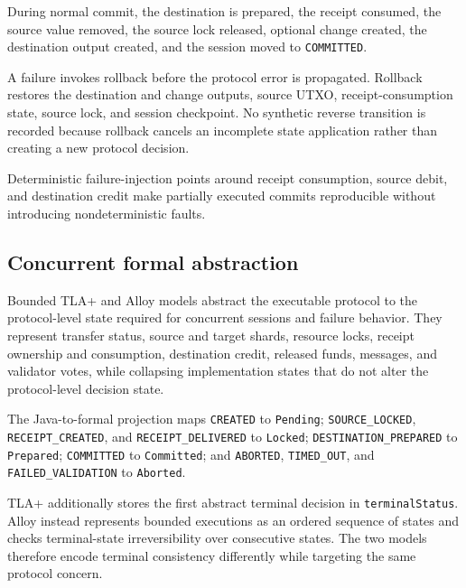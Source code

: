 During normal commit, the destination is prepared, the receipt consumed, the
source value removed, the source lock released, optional change created, the
destination output created, and the session moved to \texttt{COMMITTED}.

A failure invokes rollback before the protocol error is propagated. Rollback
restores the destination and change outputs, source UTXO, receipt-consumption
state, source lock, and session checkpoint. No synthetic reverse transition is
recorded because rollback cancels an incomplete state application rather than
creating a new protocol decision.

Deterministic failure-injection points around receipt consumption, source debit,
and destination credit make partially executed commits reproducible without
introducing nondeterministic faults.

\subsection{Concurrent formal abstraction}
\label{subsec:formal-abstraction}



Bounded TLA+ and Alloy models abstract the executable protocol to the
protocol-level state required for concurrent sessions and failure behavior. They
represent transfer status, source and target shards, resource locks, receipt
ownership and consumption, destination credit, released funds, messages, and
validator votes, while collapsing implementation states that do not alter the
protocol-level decision state.

\begingroup\raggedright
The Java-to-formal projection maps \texttt{CREATED} to \texttt{Pending};
\texttt{SOURCE\_\allowbreak LOCKED}, \texttt{RECEIPT\_\allowbreak CREATED}, and
\texttt{RECEIPT\_\allowbreak DELIVERED} to \texttt{Locked};
\texttt{DESTINATION\_\allowbreak PREPARED} to \texttt{Prepared};
\texttt{COMMITTED} to \texttt{Committed}; and \texttt{ABORTED},
\texttt{TIMED\_\allowbreak OUT}, and \texttt{FAILED\_\allowbreak VALIDATION} to
\texttt{Aborted}.
\par\endgroup

TLA+ additionally stores the first abstract terminal decision in
\texttt{terminalStatus}. Alloy instead represents bounded executions as an
ordered sequence of states and checks terminal-state irreversibility over
consecutive states. The two models therefore encode terminal consistency
differently while targeting the same protocol concern.

